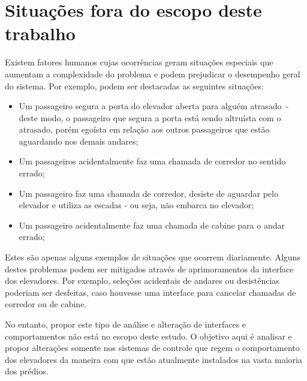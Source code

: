 \section{\label{section:difficulties}Situações fora do escopo deste trabalho}

Existem fatores humanos cujas ocorrências geram situações especiais que aumentam
a complexidade do problema e podem prejudicar o desempenho geral do sistema. Por
exemplo, podem ser destacadas as seguintes situações:

\begin{itemize}\setlength\itemsep{0mm}
  \item Um passageiro segura a porta do elevador aberta para alguém atrasado~-~
        deste modo, o passageiro que segura a porta está sendo altruísta com o
        atrasado, porém egoísta em relação aos outros passageiros que estão
        aguardando nos demais andares;
  \item Um passageiros acidentalmente faz uma chamada de corredor no sentido
        errado;
  \item Um passageiro faz uma chamada de corredor, desiste de aguardar pelo
        elevador e utiliza as escadas - ou seja, não embarca no elevador;
  \item Um passageiro acidentalmente faz uma chamada de cabine para o andar
        errado;
\end{itemize}

Estes são apenas alguns exemplos de situações que ocorrem diariamente. Alguns
destes problemas podem ser mitigados através de aprimoramentos da interface dos
elevadores. Por exemplo, seleções acidentais de andares ou desistências poderiam
ser desfeitas, caso houvesse uma interface para cancelar chamadas de corredor ou
de cabine.

No entanto, propor este tipo de análise e alteração de interfaces e
comportamentos não está no escopo deste estudo. O objetivo aqui é analisar e
propor alterações somente nos sistemas de controle que regem o comportamento dos
elevadores da maneira com que estão atualmente instalados na vasta maioria dos
prédios.